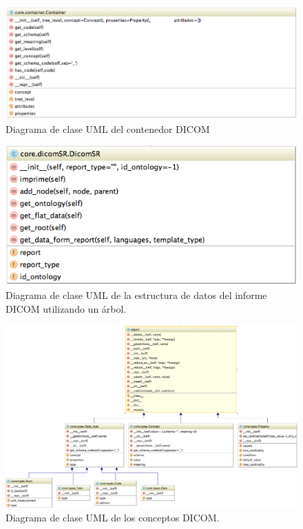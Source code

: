 \begin{figure}[ht]
\centering
\includegraphics[scale=0.5]{./imgs/diagramasUML/core/container.png}
\caption{Diagrama de clase UML del contenedor DICOM}
\label{fig:uml-container}
\end{figure}

\begin{figure}[ht]
\centering
\includegraphics[scale=0.5]{./imgs/diagramasUML/core/dicomSR.png}
\caption{Diagrama de clase UML de la estructura de datos del informe DICOM utilizando un árbol.}
\label{fig:uml-dicomSR}
\end{figure}

\begin{figure}[ht]
\centering
\includegraphics[scale=0.35]{./imgs/diagramasUML/core/types.png}
\caption{Diagrama de clase UML de los conceptos DICOM.}
\label{fig:uml-types}
\end{figure}


